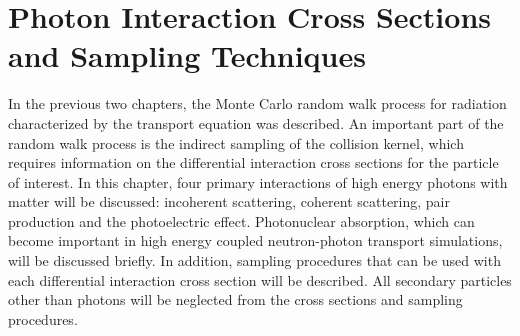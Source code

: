 \chapter{Photon Interaction Cross Sections and Sampling Techniques}
\label{ch:photon_interactions}
In the previous two chapters, the Monte Carlo random walk process for radiation 
characterized by the transport equation was described. An important part of the 
random walk process is the indirect sampling of the collision kernel, which 
requires information on the differential interaction cross sections for the 
particle of interest. In this chapter, four primary interactions of high energy 
photons with matter will be discussed: incoherent scattering, coherent 
scattering, pair production and the photoelectric effect. Photonuclear 
absorption, which can become important in high energy coupled neutron-photon 
transport simulations, will be discussed briefly. In addition, sampling 
procedures that can be used with each differential interaction cross section 
will be described. All secondary particles other than photons will be neglected 
from the cross sections and sampling procedures. 

